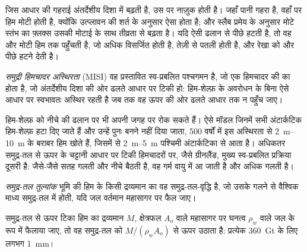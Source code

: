 जिस आधार की गहराई अंतर्देशीय दिशा में बढ़ती है, उस पर  नाज़ुक होती है। जहाँ
पानी गहरा है, वहाँ  पर हिम मोटी होती है, क्योंकि उत्प्लावन की शर्त के अनुसार ऐसा होता है; और
स्लैब प्रमेय के अनुसार मोटे स्तंभ का फ़्लक्स उसकी मोटाई के साथ तीव्रता से बढ़ता है। यदि
 ऐसी ढलान से पीछे हटती है, तो
वह और मोटी हिम तक पहुँचती है, जो अधिक विसर्जित होती है, तेज़ी से पतली होती है,
और रेखा को और पीछे हटने देती है।

\begin{definition}[समुद्री हिमचादर अस्थिरता]\label{def:b3:glaciology:misi}
\emph{समुद्री हिमचादर अस्थिरता}
(MISI) वह प्रस्तावित स्व-प्रबलित पश्चगमन है, जो एक हिमचादर की  का होता है,
जो अंतर्देशीय दिशा की ओर ढलते आधार पर टिकी हो: हिम-शेल्फ़ के अवरोधन के बिना
ऐसे आधार पर  स्वभावतः अस्थिर रहती है
जब तक वह ऊपर की ओर ढलते आधार तक न पहुँच जाए।
\end{definition}

हिम-शेल्फ़  को नीचे की ढलान पर भी अपनी जगह पर रोक सकते हैं।
ऐसे मॉडल जिनमें सभी अंटार्कटिक हिम-शेल्फ़ हटा दिए जाते हैं और उन्हें पुनः बनने नहीं दिया जाता,
500 वर्षों में इस अस्थिरता से \qtyrange{2}{10}{m}  के बराबर हिम खोते हैं,
जिसमें से \qtyrange{2}{5}{m} पश्चिमी अंटार्कटिका से आता है।
अधिकतर समुद्र-तल से ऊपर के चट्टानी आधार पर टिकी हिमचादरों पर, जैसे
ग्रीनलैंड, मुख्य स्व-प्रबलित प्रक्रिया दूसरी है: जैसे-जैसे सतह
गलती और नीचे बैठती है, वह गर्म वायु में आ जाती है और अधिक गलती है।

\begin{definition}[समुद्र-तल तुल्यांक]\label{def:b3:glaciology:sle}
\emph{समुद्र-तल तुल्यांक} भूमि की हिम के किसी द्रव्यमान का
वह समुद्र-तल-वृद्धि है, जो उसके गलने से वैश्विक माध्य समुद्र-तल में होती,
यदि जल वर्तमान महासागर पर फैल जाए।
\end{definition}

\begin{proposition}[हिम के द्रव्यमान का समुद्र-तल तुल्यांक]\label{prop:b3:glaciology:sle}
समुद्र-तल से ऊपर टिका हिम का द्रव्यमान $M$, क्षेत्रफल $A_o$ वाले महासागर पर
घनत्व $\rho_w$ वाले जल के रूप में फैलाया जाए, तो वह समुद्र-तल को $M/(\rho_wA_o)$ से ऊपर उठाता है:
प्रत्येक \qty{360}{Gt} के लिए लगभग \qty{1}{mm}।
\end{proposition}

